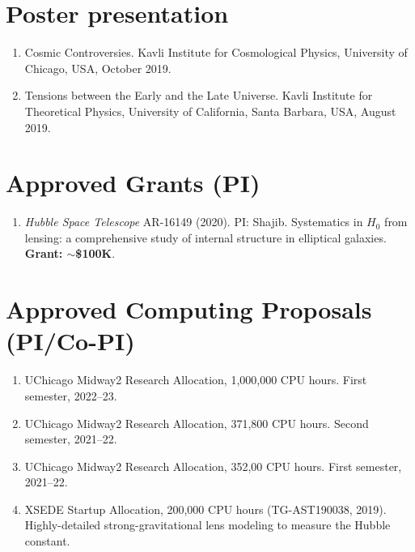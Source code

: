 \documentclass[margin, line]{res}
\begin{document}
\begin{resume}
\section{\sc Poster presentation}
\begin{enumerate}
	\item Cosmic Controversies. Kavli Institute for Cosmological Physics, University of Chicago, USA, October 2019.
	\item Tensions between the Early and the Late Universe. Kavli Institute for Theoretical Physics, University of California, Santa Barbara, USA, August 2019.
\end{enumerate}

\section{\sc Approved Grants (PI)}
\begin{enumerate}
	\item \textit{Hubble Space Telescope} AR-16149 (2020). PI: Shajib. Systematics in $H_0$ from lensing: a comprehensive study of internal structure in elliptical galaxies. \textbf{Grant: $\sim$\$100K}.
\end{enumerate}

\section{\sc Approved Computing Proposals (PI/Co-PI)}
\begin{enumerate}
\item UChicago Midway2 Research Allocation, 1,000,000 CPU hours. First semester, 2022--23.
\item UChicago Midway2 Research Allocation, 371,800 CPU hours. Second semester, 2021--22.
\item UChicago Midway2 Research Allocation, 352,00 CPU hours. First semester, 2021--22.
\item XSEDE Startup Allocation, 200,000 CPU hours (TG-AST190038, 2019). Highly-detailed strong-gravitational lens modeling to measure the Hubble constant.   
\end{enumerate}


\end{resume}
\end{document}

